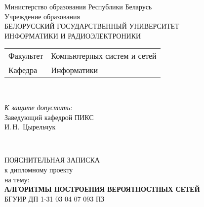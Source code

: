 \usepackage[T1]{fontenc}

\usepackage[utf8]{inputenc}

\begin{titlepage}
  \begin{center}
    Министерство образования Республики Беларусь\\[1em]
    Учреждение образования\\
    БЕЛОРУССКИЙ ГОСУДАРСТВЕННЫЙ УНИВЕРСИТЕТ \\
    ИНФОРМАТИКИ И РАДИОЭЛЕКТРОНИКИ\\[1em]

    \begin{minipage}{\textwidth}
      \begin{flushleft}
        \begin{tabular}{ l l }
          Факультет & Компьютерных систем и сетей\\
          Кафедра   & Информатики
        \end{tabular}
      \end{flushleft}
    \end{minipage}\\[1em]

    \begin{flushright}
      \begin{minipage}{0.4\textwidth}
        \textit{К защите допустить:}\\[0.8em]
        Заведующий кафедрой ПИКС\\[0.45em]
        \underline{\hspace*{2.8cm}} И.\,Н.~Цырельчук
      \end{minipage}\\[2.2em]
    \end{flushright}

    {ПОЯСНИТЕЛЬНАЯ ЗАПИСКА}\\
    {к дипломному проекту}\\
    {на тему:}\\[1em]
    \textbf{\large АЛГОРИТМЫ ПОСТРОЕНИЯ ВЕРОЯТНОСТНЫХ СЕТЕЙ}\\[1em]


    {БГУИР ДП 1-31 03 04 07 093 ПЗ}\\[2em]
    

\end{center}
\end{titlepage}
